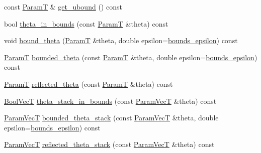 \begin{DoxyCompactItemize}
\item 
const \hyperlink{classmappel_1_1PointEmitterModel_a665ec6aea3aac139bb69a23c06d4b9a1}{ParamT} \& \hyperlink{classmappel_1_1PointEmitterModel_a0dfb473c48d177a4540d328abb03cd55}{get\+\_\+ubound} () const 
\item 
bool \hyperlink{classmappel_1_1PointEmitterModel_ad50dfc29b6e7167fb4caf8683353079d}{theta\+\_\+in\+\_\+bounds} (const \hyperlink{classmappel_1_1PointEmitterModel_a665ec6aea3aac139bb69a23c06d4b9a1}{ParamT} \&theta) const 
\item 
void \hyperlink{classmappel_1_1PointEmitterModel_a789dfcc9ea1df17a0282fca5705ade85}{bound\+\_\+theta} (\hyperlink{classmappel_1_1PointEmitterModel_a665ec6aea3aac139bb69a23c06d4b9a1}{ParamT} \&theta, double epsilon=\hyperlink{classmappel_1_1PointEmitterModel_ac987a119137b85a27704b1c40e3fab8c}{bounds\+\_\+epsilon}) const 
\item 
\hyperlink{classmappel_1_1PointEmitterModel_a665ec6aea3aac139bb69a23c06d4b9a1}{ParamT} \hyperlink{classmappel_1_1PointEmitterModel_ac342b21db8970dfa0b2809ffe5e73d06}{bounded\+\_\+theta} (const \hyperlink{classmappel_1_1PointEmitterModel_a665ec6aea3aac139bb69a23c06d4b9a1}{ParamT} \&theta, double epsilon=\hyperlink{classmappel_1_1PointEmitterModel_ac987a119137b85a27704b1c40e3fab8c}{bounds\+\_\+epsilon}) const 
\item 
\hyperlink{classmappel_1_1PointEmitterModel_a665ec6aea3aac139bb69a23c06d4b9a1}{ParamT} \hyperlink{classmappel_1_1PointEmitterModel_a7dd386776870462e8f20c646b6fed1e3}{reflected\+\_\+theta} (const \hyperlink{classmappel_1_1PointEmitterModel_a665ec6aea3aac139bb69a23c06d4b9a1}{ParamT} \&theta) const 
\item 
\hyperlink{namespacemappel_a167d761ecce3cafb6f98c00c16bdb523}{Bool\+VecT} \hyperlink{classmappel_1_1PointEmitterModel_a7b6a59b4bc796b440025cffb7a6159f8}{theta\+\_\+stack\+\_\+in\+\_\+bounds} (const \hyperlink{classmappel_1_1PointEmitterModel_add253b568d763f1513a810aac35de719}{Param\+VecT} \&theta) const 
\item 
\hyperlink{classmappel_1_1PointEmitterModel_add253b568d763f1513a810aac35de719}{Param\+VecT} \hyperlink{classmappel_1_1PointEmitterModel_a6671c06d391ae9a09dd5de78dcc636fe}{bounded\+\_\+theta\+\_\+stack} (const \hyperlink{classmappel_1_1PointEmitterModel_add253b568d763f1513a810aac35de719}{Param\+VecT} \&theta, double epsilon=\hyperlink{classmappel_1_1PointEmitterModel_ac987a119137b85a27704b1c40e3fab8c}{bounds\+\_\+epsilon}) const 
\item 
\hyperlink{classmappel_1_1PointEmitterModel_add253b568d763f1513a810aac35de719}{Param\+VecT} \hyperlink{classmappel_1_1PointEmitterModel_ae24c17017ff5e37e1dd9ea9a1aeefa7f}{reflected\+\_\+theta\+\_\+stack} (const \hyperlink{classmappel_1_1PointEmitterModel_add253b568d763f1513a810aac35de719}{Param\+VecT} \&theta) const 

\end{DoxyCompactItemize}
